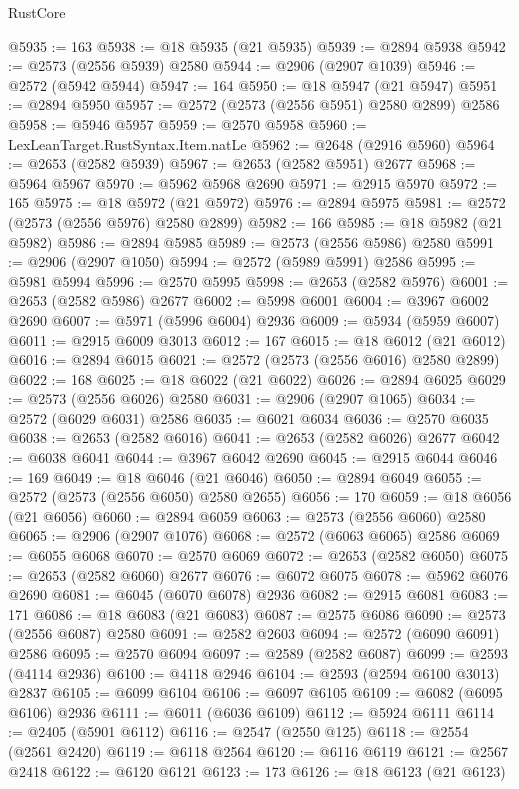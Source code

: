 \begin{lexlean}{RustCore}
\begin{coremodule}
@5935 := 163
@5938 := @18 @5935 (@21 @5935)
@5939 := @2894 @5938
@5942 := @2573 (@2556 @5939) @2580
@5944 := @2906 (@2907 @1039)
@5946 := @2572 (@5942 @5944)
@5947 := 164
@5950 := @18 @5947 (@21 @5947)
@5951 := @2894 @5950
@5957 := @2572 (@2573 (@2556 @5951) @2580 @2899) @2586
@5958 := @5946 @5957
@5959 := @2570 @5958
@5960 := LexLeanTarget.RustSyntax.Item.natLe
@5962 := @2648 (@2916 @5960)
@5964 := @2653 (@2582 @5939)
@5967 := @2653 (@2582 @5951) @2677
@5968 := @5964 @5967
@5970 := @5962 @5968 @2690
@5971 := @2915 @5970
@5972 := 165
@5975 := @18 @5972 (@21 @5972)
@5976 := @2894 @5975
@5981 := @2572 (@2573 (@2556 @5976) @2580 @2899)
@5982 := 166
@5985 := @18 @5982 (@21 @5982)
@5986 := @2894 @5985
@5989 := @2573 (@2556 @5986) @2580
@5991 := @2906 (@2907 @1050)
@5994 := @2572 (@5989 @5991) @2586
@5995 := @5981 @5994
@5996 := @2570 @5995
@5998 := @2653 (@2582 @5976)
@6001 := @2653 (@2582 @5986) @2677
@6002 := @5998 @6001
@6004 := @3967 @6002 @2690
@6007 := @5971 (@5996 @6004) @2936
@6009 := @5934 (@5959 @6007)
@6011 := @2915 @6009 @3013
@6012 := 167
@6015 := @18 @6012 (@21 @6012)
@6016 := @2894 @6015
@6021 := @2572 (@2573 (@2556 @6016) @2580 @2899)
@6022 := 168
@6025 := @18 @6022 (@21 @6022)
@6026 := @2894 @6025
@6029 := @2573 (@2556 @6026) @2580
@6031 := @2906 (@2907 @1065)
@6034 := @2572 (@6029 @6031) @2586
@6035 := @6021 @6034
@6036 := @2570 @6035
@6038 := @2653 (@2582 @6016)
@6041 := @2653 (@2582 @6026) @2677
@6042 := @6038 @6041
@6044 := @3967 @6042 @2690
@6045 := @2915 @6044
@6046 := 169
@6049 := @18 @6046 (@21 @6046)
@6050 := @2894 @6049
@6055 := @2572 (@2573 (@2556 @6050) @2580 @2655)
@6056 := 170
@6059 := @18 @6056 (@21 @6056)
@6060 := @2894 @6059
@6063 := @2573 (@2556 @6060) @2580
@6065 := @2906 (@2907 @1076)
@6068 := @2572 (@6063 @6065) @2586
@6069 := @6055 @6068
@6070 := @2570 @6069
@6072 := @2653 (@2582 @6050)
@6075 := @2653 (@2582 @6060) @2677
@6076 := @6072 @6075
@6078 := @5962 @6076 @2690
@6081 := @6045 (@6070 @6078) @2936
@6082 := @2915 @6081
@6083 := 171
@6086 := @18 @6083 (@21 @6083)
@6087 := @2575 @6086
@6090 := @2573 (@2556 @6087) @2580
@6091 := @2582 @2603
@6094 := @2572 (@6090 @6091) @2586
@6095 := @2570 @6094
@6097 := @2589 (@2582 @6087)
@6099 := @2593 (@4114 @2936)
@6100 := @4118 @2946
@6104 := @2593 (@2594 @6100 @3013) @2837
@6105 := @6099 @6104
@6106 := @6097 @6105
@6109 := @6082 (@6095 @6106) @2936
@6111 := @6011 (@6036 @6109)
@6112 := @5924 @6111
@6114 := @2405 (@5901 @6112)
@6116 := @2547 (@2550 @125)
@6118 := @2554 (@2561 @2420)
@6119 := @6118 @2564
@6120 := @6116 @6119
@6121 := @2567 @2418
@6122 := @6120 @6121
@6123 := 173
@6126 := @18 @6123 (@21 @6123)

\end{coremodule}
\end{lexlean}

